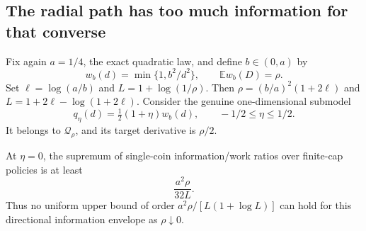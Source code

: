 \subsection{The radial path has too much information for that converse}
Fix again $a=1/4$, the exact quadratic law, and define $b\in(0,a)$ by
\[
 w_b(d)=\min\{1,b^2/d^2\},\qquad
 \mathbb E w_b(D)=\rho.
\]
Set $\ell=\log(a/b)$ and $L=1+\log(1/\rho)$. Then
$\rho=(b/a)^2(1+2\ell)$ and
$L=1+2\ell-\log(1+2\ell)$.
Consider the genuine one-dimensional submodel
\[
 q_\eta(d)=\tfrac12(1+\eta)w_b(d),\qquad -1/2\le\eta\le1/2.
\]
It belongs to $\mathcal Q_\rho$, and its target derivative is $\rho/2$.

\begin{proposition}\label{pop:radial-information}
At $\eta=0$, the supremum of single-coin information/work ratios over
finite-cap policies is at least
\[
 \frac{a^2\rho}{32L}.
\]
Thus no uniform upper bound of order $a^2\rho/[L(1+\log L)]$ can hold
for this directional information envelope as $\rho\downarrow0$.
\end{proposition}
